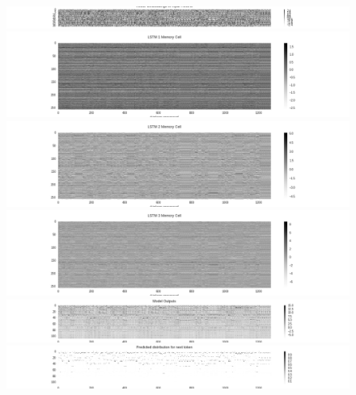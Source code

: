 \documentclass[dissertation.tex]{subfiles}
\begin{document}
\begin{figure}[htpb]
    \centering
    \includegraphics[width=1.0\linewidth]{Figures/model-analysis-tokens-0.png}
    \includegraphics[width=1.0\linewidth]{Figures/model-analysis-tokens-1.png}
    \includegraphics[width=1.0\linewidth]{Figures/model-analysis-tokens-2.png}
    \includegraphics[width=1.0\linewidth]{Figures/model-analysis-tokens-3.png}
    \includegraphics[width=1.0\linewidth]{Figures/model-analysis-tokens-4.png}
    \includegraphics[width=1.0\linewidth]{Figures/model-analysis-tokens-5.png}
    \caption{}
    \label{fig:}
\end{figure}
\end{document}
